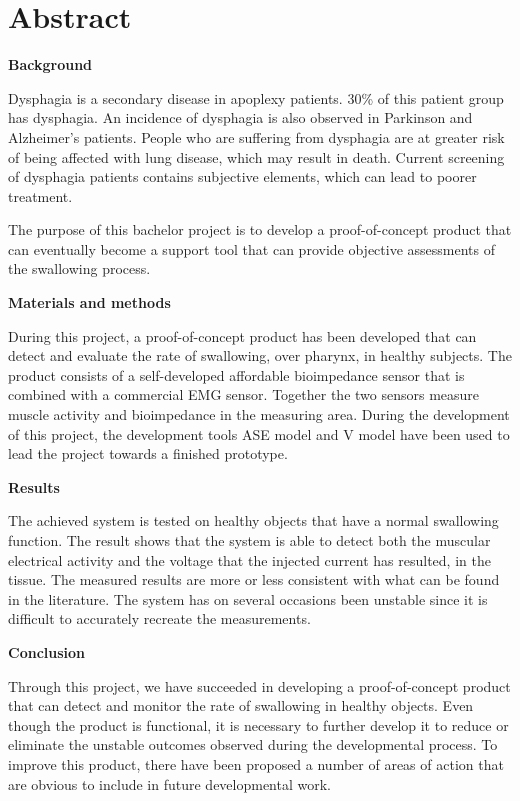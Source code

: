 \chapter{Abstract}


\textbf{Background}

Dysphagia is a secondary disease in apoplexy patients. 30\% of this patient group has dysphagia. An incidence of dysphagia is also observed in Parkinson and Alzheimer's patients. People who are suffering from dysphagia are at greater risk of being affected with lung disease, which may result in death. Current screening of dysphagia patients contains subjective elements, which can lead to poorer treatment.

The purpose of this bachelor project is to develop a proof-of-concept product that can eventually become a support tool that can provide objective assessments of the swallowing   process.

\textbf{Materials and methods}

During this project, a proof-of-concept product has been developed that can detect and evaluate the rate of swallowing, over pharynx, in healthy subjects. The product consists of a self-developed affordable bioimpedance sensor that is combined with a commercial EMG sensor. Together the two sensors measure muscle activity and bioimpedance
in the measuring area. During the development of this project, the development tools ASE model and V model have been used to lead the project towards a finished prototype.

\textbf{Results}

The achieved system is tested on healthy objects that have a normal swallowing function. The result shows that the system is able to detect both the muscular electrical activity and the voltage that the injected current has resulted, in the tissue. The measured results are more or less consistent with what can be found in the literature. The system has on several occasions been unstable since it is difficult to accurately recreate the measurements.

\textbf{Conclusion}

Through this project, we have succeeded in developing a proof-of-concept product that can detect and monitor the rate of swallowing in healthy objects. Even though the product is functional, it is necessary to further develop it to reduce or eliminate the unstable outcomes observed during the developmental process. To improve this product, there have been proposed a number of areas of action that are obvious to include in future developmental work.
